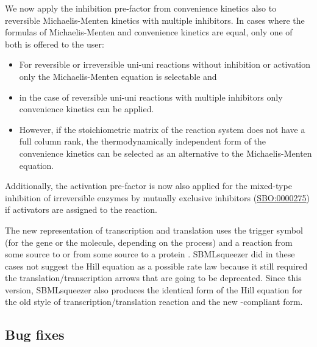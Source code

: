 We now apply the inhibition pre-factor from convenience kinetics also to
reversible Michaelis-Menten kinetics with multiple inhibitors. In cases where
the formulas of Michaelis-Menten and convenience kinetics are equal, only one of
both is offered to the user:
\begin{itemize}
\item For reversible or irreversible uni-uni reactions without inhibition or
      activation only the Micha\-elis-Menten equation is selectable and
\item in the case of reversible uni-uni reactions with multiple inhibitors only
      convenience kinetics can be applied.
\item However, if the stoichiometric matrix of the reaction system does not have
      a full column rank, the thermodynamically independent form of the
      convenience kinetics can be selected as an alternative to the
      Michaelis-Menten equation.
\end{itemize}
Additionally, the activation pre-factor is now also applied for the mixed-type
inhibition of irreversible enzymes by mutually exclusive inhibitors
(\href{identifiers.org/biomodels.sbo/SBO:0000275}{SBO:0000275}) if activators
are assigned to the reaction.

The new \SBGN representation of transcription and translation uses the trigger
symbol (for the gene or the \RNA molecule, depending on the process) and a
reaction from some source to \RNA or from some source to a protein \citep{LeNovere2009}.
SBMLsqueezer did in these cases not suggest the Hill equation as a possible rate law because
it still required the translation/transcription arrows that are going to be
deprecated. Since this version, SBMLsqueezer also produces the identical form of
the Hill equation for the old style of transcription/translation reaction and
the new \SBGN-compliant form.

\subsection{Bug fixes}

